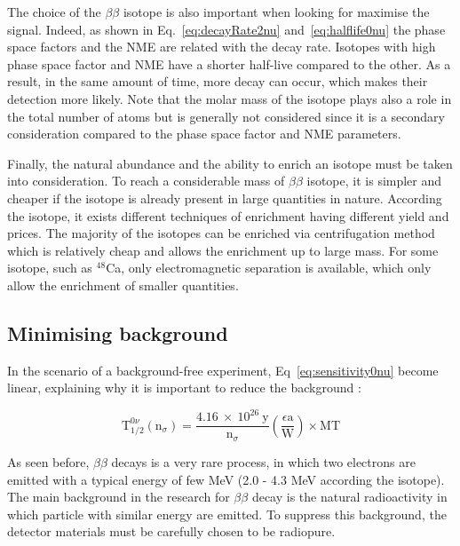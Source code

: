 \documentclass[main.tex]{subfiles}
\begin{document}
\NI The choice of the $\beta\beta$ isotope is also important when looking for maximise the signal. Indeed, as shown in Eq.~\ref{eq:decayRate2nu} and~\ref{eq:halflife0nu} the phase space factors and the NME are related with the decay rate. Isotopes with high phase space factor and NME have a shorter half-live compared to the other. As a result, in the same amount of time, more decay can occur, which makes their detection more likely. Note that the molar mass of the isotope plays also a role in the total number of atoms but is generally not considered since it is a secondary consideration compared to the phase space factor and NME parameters.


\bigskip


\NI Finally, the natural abundance and the ability to enrich an isotope must be taken into consideration. To reach a considerable mass of $\beta\beta$ isotope, it is simpler and cheaper if the isotope is already present in large quantities in nature. According the isotope, it exists different techniques of enrichment having different yield and prices. The majority of the isotopes can be enriched via centrifugation method which is relatively cheap and allows the enrichment up to large mass. For some isotope, such as $^{48}$Ca, only electromagnetic separation is available, which only allow the enrichment of smaller quantities.


\subsection{Minimising background}


\NI In the scenario of a background-free experiment, Eq~\ref{eq:sensitivity0nu} become linear, explaining why it is important to reduce the background :


\begin{equation}
\text{T}_{\text{1/2}}^{0\nu} (\text{n}_\sigma) = \frac{\text{4.16}~\times~\text{10}^{\text{26}}~\text{y}}{\text{n}_\sigma} \left(\frac{\epsilon \text{a}}{\text{W}} \right) \times \text{MT}
\end{equation}


\NI As seen before, $\beta\beta$ decays is a very rare process, in which two electrons are emitted with a typical energy of few MeV (2.0 - 4.3 MeV according the isotope). The main background in the research for $\beta\beta$ decay is the natural radioactivity in which particle with similar energy are emitted. To suppress this background, the detector materials must be carefully chosen to be radiopure.
\end{document}

